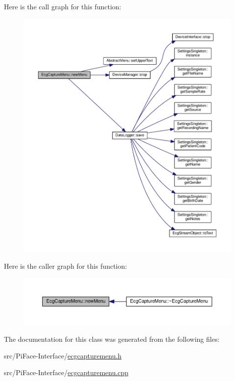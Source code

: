 Here is the call graph for this function\+:\nopagebreak
\begin{figure}[H]
\begin{center}
\leavevmode
\includegraphics[width=350pt]{classEcgCaptureMenu_a610d2985e09cd56cb381e6e443dbbc72_cgraph}
\end{center}
\end{figure}




Here is the caller graph for this function\+:\nopagebreak
\begin{figure}[H]
\begin{center}
\leavevmode
\includegraphics[width=350pt]{classEcgCaptureMenu_a610d2985e09cd56cb381e6e443dbbc72_icgraph}
\end{center}
\end{figure}




The documentation for this class was generated from the following files\+:\begin{DoxyCompactItemize}
\item 
src/\+Pi\+Face-\/\+Interface/\hyperlink{ecgcapturemenu_8h}{ecgcapturemenu.\+h}\item 
src/\+Pi\+Face-\/\+Interface/\hyperlink{ecgcapturemenu_8cpp}{ecgcapturemenu.\+cpp}\end{DoxyCompactItemize}
